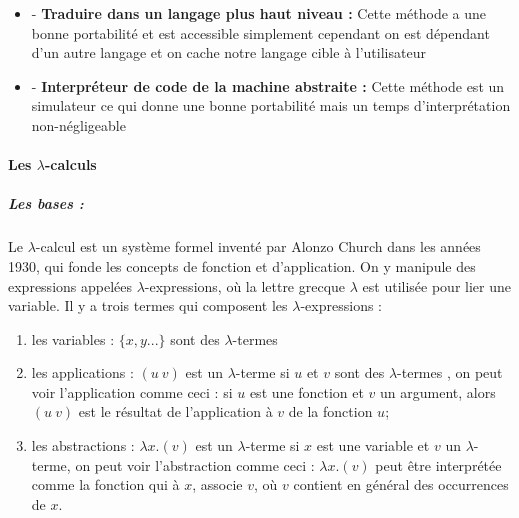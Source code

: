 \documentclass[10pt,a4paper]{article}
\begin{document}
\begin{itemize}
\begin{itemize}
						\item[] - \textbf{Traduire dans un langage plus haut niveau :} Cette méthode a une bonne portabilité et est accessible simplement cependant on est dépendant d'un autre langage et on cache notre langage cible à l'utilisateur
						\item[] - \textbf{Interpréteur de code de la machine abstraite :} Cette méthode est un simulateur ce qui donne une bonne portabilité mais un temps d'interprétation non-négligeable
					\end{itemize}
				\end{itemize}
				\newpage	
				
				
	
			\paragraph{Les  $\lambda$-calculs}
			
				\subparagraph{Les bases :}
				Le $\lambda$-calcul est un système formel inventé par Alonzo Church dans les années 1930, qui fonde les concepts de fonction et d'application. On y manipule des expressions appelées $\lambda$-expressions, où la lettre grecque $\lambda$ est utilisée pour lier une variable. Il y a trois termes qui composent les $\lambda$-expressions :
				\begin{enumerate}
					\item les variables : $\{x, y...\}$ sont des $\lambda$-termes 
					\item les applications : $(u~v)$ est un $\lambda$-terme si $u$ et $v$ sont des $\lambda$-termes , on peut voir l'application comme ceci : si $u$ est une fonction et $v$ un argument, alors $(u~v)$ est le résultat de l'application à $v$ de la fonction $u$; 
					\item les abstractions : $\lambda x.(v)$ est un $\lambda$-terme si $x$ est une variable et $v$ un $\lambda$-terme, on peut voir l'abstraction comme ceci : $\lambda x.(v)$ peut être interprétée comme la fonction qui à $x$, associe $v$, où $v$ contient en général des occurrences de $x$.
				\end{enumerate}
				\bigbreak
				
\end{document}

